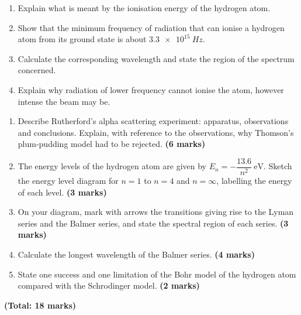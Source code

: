 \documentclass[11pt]{article}
\newcommand{\cle}[1]{{\popxbold\color{popdark}#1}}
\newcounter{popsec}
\newcounter{popsub}
\newcommand{\courssub}[1]{%
  \stepcounter{popsub}%
  \par\vspace{9pt}\noindent{\popxbold\fontsize{11.5}{13}\selectfont\color{popink}{\color{poporange}\thepopsec.\thepopsub}\hspace{6pt}#1}\par\nopagebreak\vspace{4pt}
}
\begin{document}
\begin{exercice}
\begin{enumerate}
\item Explain what is meant by the \cle{ionisation energy} of the hydrogen atom.
\item Show that the minimum frequency of radiation that can ionise a hydrogen atom from its ground state is about $\SI{3.3e15}{Hz}$.
\item Calculate the corresponding wavelength and state the region of the spectrum concerned.
\item Explain why radiation of lower frequency cannot ionise the atom, however intense the beam may be.
\end{enumerate}
\end{exercice}

\courssub{I prepare for the GCE}

\begin{exercice}
\begin{enumerate}
\item Describe Rutherford's alpha scattering experiment: apparatus, observations and conclusions. Explain, with reference to the observations, why Thomson's plum-pudding model had to be rejected. \textbf{(6 marks)}
\item The energy levels of the hydrogen atom are given by $E_n = -\dfrac{13.6}{n^{2}}\ \mathrm{eV}$. Sketch the energy level diagram for $n = 1$ to $n = 4$ and $n = \infty$, labelling the energy of each level. \textbf{(3 marks)}
\item On your diagram, mark with arrows the transitions giving rise to the Lyman series and the Balmer series, and state the spectral region of each series. \textbf{(3 marks)}
\item Calculate the longest wavelength of the Balmer series. \textbf{(4 marks)}
\item State one success and one limitation of the Bohr model of the hydrogen atom compared with the Schrodinger model. \textbf{(2 marks)}
\end{enumerate}
\textbf{(Total: 18 marks)}
\end{exercice}
\end{document}

